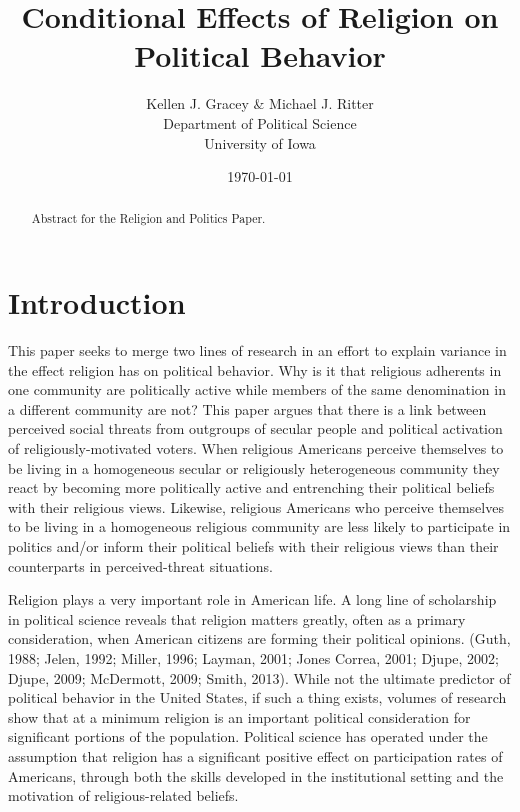 \documentclass{article}
\author{Kellen J. Gracey \& Michael J. Ritter \\
        Department of Political Science \\
        University of Iowa}
\date{\today}
\title{Conditional Effects of Religion on Political Behavior}
\begin{document}

\maketitle

\begin{abstract}

Abstract for the Religion and Politics Paper.

\end{abstract}

\section*{Introduction}

This paper seeks to merge two lines of research in an effort to explain variance in the effect religion has on political behavior.  Why is it that religious adherents in one community are politically active while members of the same denomination in a different community are not?  This paper argues that there is a link between perceived social threats from outgroups of secular people and political activation of religiously-motivated voters.  When religious Americans perceive themselves to be living in a homogeneous secular or religiously heterogeneous community they react by becoming more politically active and entrenching their political beliefs with their religious views.  Likewise, religious Americans who perceive themselves to be living in a homogeneous religious community are less likely to participate in politics and/or inform their political beliefs with their religious views than their counterparts in perceived-threat situations.

Religion plays a very important role in American life.  A long line of scholarship in political science reveals that religion matters greatly, often as a primary consideration, when American citizens are forming their political opinions.  (Guth, 1988; Jelen, 1992; Miller, 1996; Layman, 2001; Jones Correa, 2001; Djupe, 2002; Djupe, 2009; McDermott, 2009; Smith, 2013).  While not the ultimate predictor of political behavior in the United States, if such a thing exists, volumes of research show that at a minimum religion is an important political consideration for significant portions of the population.  Political science has operated under the assumption that religion has a significant positive effect on participation rates of Americans, through both the skills developed in the institutional setting and the motivation of religious-related beliefs. 
\end{document}
